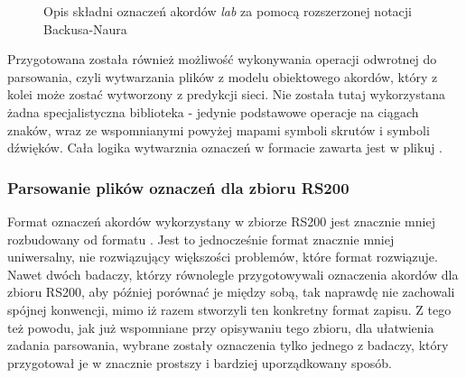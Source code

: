 \begin{figure}[h]
    \caption{Opis składni oznaczeń akordów \emph{lab} za pomocą rozszerzonej notacji Backusa-Naura}
    \label{fig:lab_syntax}
    {\scriptsize }
\end{figure}

Przygotowana została również możliwość wykonywania operacji odwrotnej do parsowania, czyli
wytwarzania plików  z modelu obiektowego akordów, który z kolei może zostać wytworzony z
predykcji sieci. Nie została tutaj wykorzystana żadna specjalistyczna biblioteka - jedynie
podstawowe operacje na ciągach znaków, wraz ze wspomnianymi powyżej mapami symboli skrutów i symboli
dźwięków. Cała logika wytwarznia oznaczeń w formacie  zawarta jest w plikuj
.

\subsubsection{Parsowanie plików oznaczeń dla zbioru RS200}

Format oznaczeń akordów wykorzystany w zbiorze RS200 jest znacznie mniej rozbudowany od formatu
. Jest to jednocześnie format znacznie mniej uniwersalny, nie rozwiązujący większości
problemów, które format  rozwiązuje. Nawet dwóch badaczy, którzy równolegle przygotowywali
oznaczenia akordów dla zbioru RS200, aby później porównać je między sobą, tak naprawdę nie zachowali
spójnej konwencji, mimo iż razem stworzyli ten konkretny format zapisu. Z tego też powodu, jak już
wspomniane przy opisywaniu tego zbioru, dla ułatwienia zadania parsowania, wybrane zostały
oznaczenia tylko jednego z badaczy, który przygotował je w znacznie prostszy i bardziej
uporządkowany sposób.

